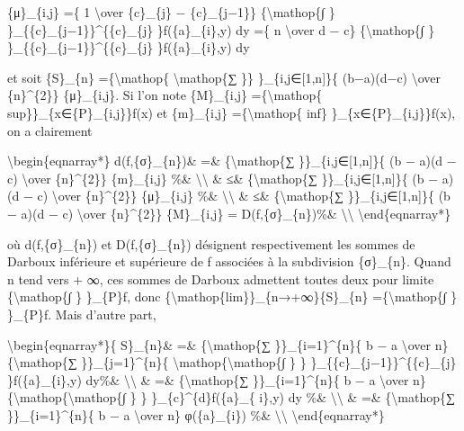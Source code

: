 \documentclass[]{article}
\begin{document}
\{μ\}\_\{i,j\} =\{ 1 \textbackslash{}over \{c\}\_\{j\} −
\{c\}\_\{j−1\}\} \{\textbackslash{}mathop\{∫ \}
\}\_\{\{c\}\_\{j−1\}\}\^{}\{\{c\}\_\{j\} \}f(\{a\}\_\{i\},y) dy =\{ n
\textbackslash{}over d − c\} \{\textbackslash{}mathop\{∫ \}
\}\_\{\{c\}\_\{j−1\}\}\^{}\{\{c\}\_\{j\} \}f(\{a\}\_\{i\},y) dy

et soit \{S\}\_\{n\} =\{\textbackslash{}mathop\{
\textbackslash{}mathop\{∑ \}\} \}\_\{i,j∈{[}1,n{]}\}\{ (b−a)(d−c)
\textbackslash{}over \{n\}\^{}\{2\}\} \{μ\}\_\{i,j\}. Si l'on note
\{M\}\_\{i,j\} =\{\textbackslash{}mathop\{
sup\}\}\_\{x∈\{P\}\_\{i,j\}\}f(x) et \{m\}\_\{i,j\}
=\{\textbackslash{}mathop\{ inf\} \}\_\{x∈\{P\}\_\{i,j\}\}f(x), on a
clairement

\textbackslash{}begin\{eqnarray*\} d(f,\{σ\}\_\{n\})\& =\&
\{\textbackslash{}mathop\{∑ \}\}\_\{i,j∈{[}1,n{]}\}\{ (b − a)(d − c)
\textbackslash{}over \{n\}\^{}\{2\}\} \{m\}\_\{i,j\} \%\&
\textbackslash{}\textbackslash{} \& ≤\& \{\textbackslash{}mathop\{∑
\}\}\_\{i,j∈{[}1,n{]}\}\{ (b − a)(d − c) \textbackslash{}over
\{n\}\^{}\{2\}\} \{μ\}\_\{i,j\} \%\& \textbackslash{}\textbackslash{} \&
≤\& \{\textbackslash{}mathop\{∑ \}\}\_\{i,j∈{[}1,n{]}\}\{ (b − a)(d − c)
\textbackslash{}over \{n\}\^{}\{2\}\} \{M\}\_\{i,j\} =
D(f,\{σ\}\_\{n\})\%\& \textbackslash{}\textbackslash{}
\textbackslash{}end\{eqnarray*\}

où d(f,\{σ\}\_\{n\}) et D(f,\{σ\}\_\{n\}) désignent respectivement les
sommes de Darboux inférieure et supérieure de f associées à la
subdivision \{σ\}\_\{n\}. Quand n tend vers + ∞, ces sommes de Darboux
admettent toutes deux pour limite \{\textbackslash{}mathop\{∫ \}
\}\_\{P\}f, donc \{\textbackslash{}mathop\{lim\}\}\_\{n→+∞\}\{S\}\_\{n\}
=\{\textbackslash{}mathop\{∫ \} \}\_\{P\}f. Mais d'autre part,

\textbackslash{}begin\{eqnarray*\}\{ S\}\_\{n\}\& =\&
\{\textbackslash{}mathop\{∑ \}\}\_\{i=1\}\^{}\{n\}\{ b − a
\textbackslash{}over n\} \{\textbackslash{}mathop\{∑
\}\}\_\{j=1\}\^{}\{n\}\{
\textbackslash{}mathop\{\textbackslash{}mathop\{∫ \} \}
\}\_\{\{c\}\_\{j−1\}\}\^{}\{\{c\}\_\{j\} \}f(\{a\}\_\{i\},y) dy\%\&
\textbackslash{}\textbackslash{} \& =\& \{\textbackslash{}mathop\{∑
\}\}\_\{i=1\}\^{}\{n\}\{ b − a \textbackslash{}over n\}
\{\textbackslash{}mathop\{\textbackslash{}mathop\{∫ \} \}
\}\_\{c\}\^{}\{d\}f(\{a\}\_\{ i\},y) dy \%\&
\textbackslash{}\textbackslash{} \& =\& \{\textbackslash{}mathop\{∑
\}\}\_\{i=1\}\^{}\{n\}\{ b − a \textbackslash{}over n\} φ(\{a\}\_\{i\})
\%\& \textbackslash{}\textbackslash{} \textbackslash{}end\{eqnarray*\}
\end{document}
